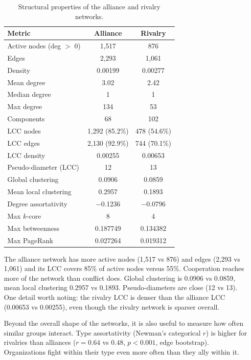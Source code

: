 \documentclass[11pt,a4paper]{article}
\begin{document}
\begin{table}[H]
\centering
\caption{Structural properties of the alliance and rivalry networks.}
\label{tab:structural}
\small
\begin{tabular}{@{}lcc@{}}
\toprule
\textbf{Metric} & \textbf{Alliance} & \textbf{Rivalry} \\
\midrule
Active nodes (deg $>$ 0) & 1{,}517 & 876 \\
Edges & 2{,}293 & 1{,}061 \\
Density & 0.00199 & 0.00277 \\
Mean degree & 3.02 & 2.42 \\
Median degree & 1 & 1 \\
Max degree & 134 & 53 \\
Components & 68 & 102 \\
LCC nodes & 1{,}292 (85.2\%) & 478 (54.6\%) \\
LCC edges & 2{,}130 (92.9\%) & 744 (70.1\%) \\
LCC density & 0.00255 & 0.00653 \\
Pseudo-diameter (LCC) & 12 & 13 \\
Global clustering & 0.0906 & 0.0859 \\
Mean local clustering & 0.2957 & 0.1893 \\
Degree assortativity & $-$0.1236 & $-$0.0796 \\
Max $k$-core & 8 & 4 \\
Max betweenness & 0.187749 & 0.134382 \\
Max PageRank & 0.027264 & 0.019312 \\
\bottomrule
\end{tabular}
\end{table}

The alliance network has more active nodes (1{,}517 vs 876) and edges (2{,}293 vs 1{,}061) and its LCC covers 85\% of active nodes versus 55\%. Cooperation reaches more of the network than conflict does. Global clustering is 0.0906 vs 0.0859, mean local clustering 0.2957 vs 0.1893. Pseudo-diameters are close (12 vs 13). One detail worth noting: the rivalry LCC is denser than the alliance LCC (0.00653 vs 0.00255), even though the rivalry network is sparser overall. 

Beyond the overall shape of the networks, it is also useful to measure how often similar groups interact. Type assortativity (Newman's categorical \href{https://journals.aps.org/pre/abstract/10.1103/PhysRevE.67.026126}{$r$}) is higher for rivalries than alliances ($r = 0.64$ vs $0.48$, $p < 0.001$, edge bootstrap). Organizations fight within their type even more often than they ally within it.
\end{document}
